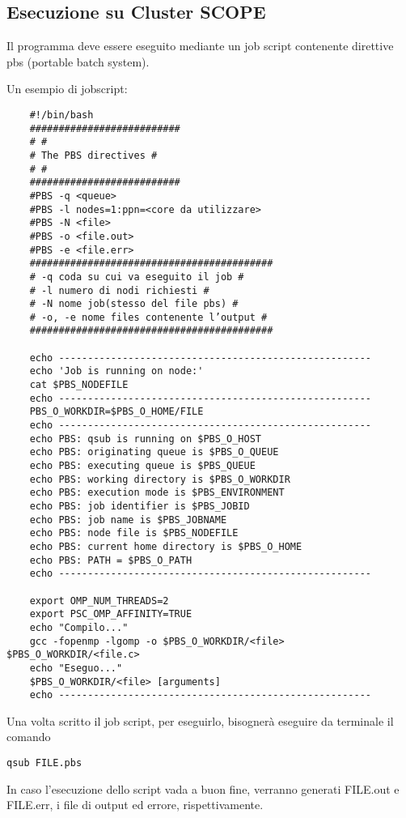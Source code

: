 \subsection{Esecuzione su Cluster SCOPE}
Il programma deve essere eseguito mediante un job script contenente direttive pbs (portable batch system).

Un esempio di jobscript:
\begin{lstlisting}
    #!/bin/bash
    ##########################
    # #
    # The PBS directives #
    # #
    ##########################
    #PBS -q <queue>
    #PBS -l nodes=1:ppn=<core da utilizzare>
    #PBS -N <file>
    #PBS -o <file.out>
    #PBS -e <file.err>
    ##########################################
    # -q coda su cui va eseguito il job #
    # -l numero di nodi richiesti #
    # -N nome job(stesso del file pbs) #
    # -o, -e nome files contenente l’output #
    ##########################################
    
    echo ------------------------------------------------------
    echo 'Job is running on node:'
    cat $PBS_NODEFILE
    echo ------------------------------------------------------
    PBS_O_WORKDIR=$PBS_O_HOME/FILE
    echo ------------------------------------------------------
    echo PBS: qsub is running on $PBS_O_HOST
    echo PBS: originating queue is $PBS_O_QUEUE
    echo PBS: executing queue is $PBS_QUEUE
    echo PBS: working directory is $PBS_O_WORKDIR
    echo PBS: execution mode is $PBS_ENVIRONMENT
    echo PBS: job identifier is $PBS_JOBID
    echo PBS: job name is $PBS_JOBNAME
    echo PBS: node file is $PBS_NODEFILE
    echo PBS: current home directory is $PBS_O_HOME
    echo PBS: PATH = $PBS_O_PATH
    echo ------------------------------------------------------
    
    export OMP_NUM_THREADS=2
    export PSC_OMP_AFFINITY=TRUE
    echo "Compilo..."
    gcc -fopenmp -lgomp -o $PBS_O_WORKDIR/<file> $PBS_O_WORKDIR/<file.c>
    echo "Eseguo..."
    $PBS_O_WORKDIR/<file> [arguments]
    echo ------------------------------------------------------
\end{lstlisting}

Una volta scritto il job script, per eseguirlo, bisognerà eseguire da terminale il comando 
\begin{lstlisting}
qsub FILE.pbs
\end{lstlisting}

In caso l'esecuzione dello script vada a buon fine, verranno generati FILE.out e FILE.err, i file di output ed errore, rispettivamente.

